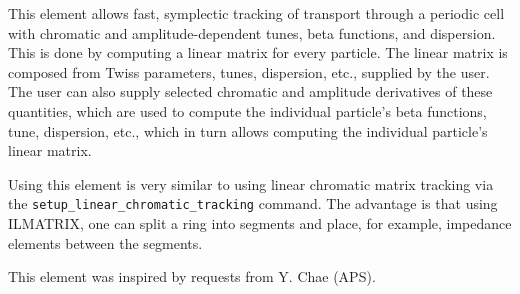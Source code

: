 This element allows fast, symplectic tracking of transport through a
periodic cell with chromatic and amplitude-dependent tunes, beta
functions, and dispersion.  This is done by computing a linear matrix
for every particle.  The linear matrix is composed from Twiss
parameters, tunes, dispersion, etc., supplied by the user.  The user
can also supply selected chromatic and amplitude derivatives of these
quantities, which are used to compute the individual particle's beta
functions, tune, dispersion, etc., which in turn allows computing the
individual particle's linear matrix.

Using this element is very similar to using linear chromatic matrix
tracking via the \verb|setup_linear_chromatic_tracking| command.
The advantage is that using ILMATRIX, one can split a ring into segments
and place, for example, impedance elements between the segments.

This element was inspired by requests from Y. Chae (APS).

